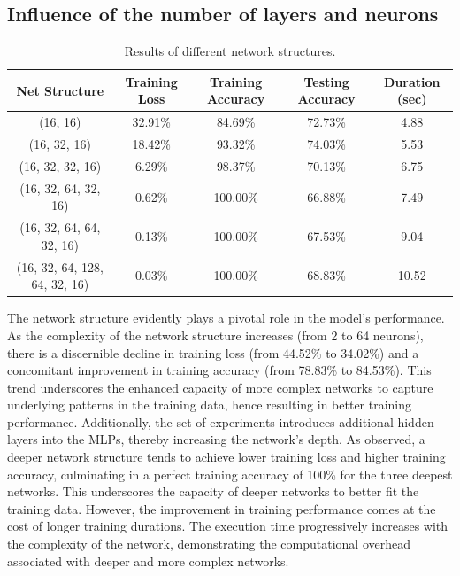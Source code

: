 \documentclass[10pt,twocolumn,letterpaper]{article}
\begin{document}
\subsection{Influence of the number of layers and neurons}

\begin{table}[h]
   \centering
   \begin{tabular}{|c|c|c|c|c|}
      \hline
      Net Structure                 & Training Loss & Training Accuracy & Testing Accuracy & Duration (sec) \\
      \hline
      (16, 16)                      & 32.91\%       & 84.69\%           & 72.73\%          & 4.88           \\
      (16, 32, 16)                  & 18.42\%       & 93.32\%           & 74.03\%          & 5.53           \\
      (16, 32, 32, 16)              & 6.29\%        & 98.37\%           & 70.13\%          & 6.75           \\
      (16, 32, 64, 32, 16)          & 0.62\%        & 100.00\%          & 66.88\%          & 7.49           \\
      (16, 32, 64, 64, 32, 16)      & 0.13\%        & 100.00\%          & 67.53\%          & 9.04           \\
      (16, 32, 64, 128, 64, 32, 16) & 0.03\%        & 100.00\%          & 68.83\%          & 10.52          \\
      \hline
   \end{tabular}
   \caption{Results of different network structures.}
   \label{tab:net_struct_results}
\end{table}

The network structure evidently plays a pivotal role in the model's performance. As the complexity of the network structure increases (from 2 to 64 neurons), there is a discernible decline in training loss (from 44.52\% to 34.02\%) and a concomitant improvement in training accuracy (from 78.83\% to 84.53\%). This trend underscores the enhanced capacity of more complex networks to capture underlying patterns in the training data, hence resulting in better training performance. Additionally, the set of experiments introduces additional hidden layers into the MLPs, thereby increasing the network's depth. As observed, a deeper network structure tends to achieve lower training loss and higher training accuracy, culminating in a perfect training accuracy of 100\% for the three deepest networks. This underscores the capacity of deeper networks to better fit the training data. However, the improvement in training performance comes at the cost of longer training durations. The execution time progressively increases with the complexity of the network, demonstrating the computational overhead associated with deeper and more complex networks.
\end{document}
